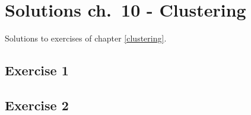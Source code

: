 \documentclass[]{book}
\theoremstyle{definition}
\theoremstyle{definition}
\theoremstyle{definition}
\theoremstyle{remark}
\begin{document}
\chapter{Solutions ch.~10 - Clustering}\label{solutions-clustering}

Solutions to exercises of chapter \ref{clustering}.

\section{Exercise 1}\label{exercise-1-7}

\section{Exercise 2}\label{exercise-2-7}


\end{document}
